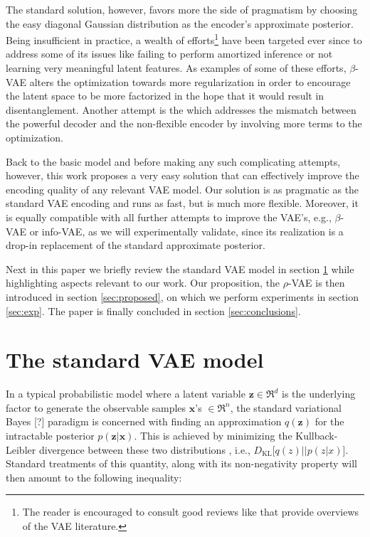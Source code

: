 \documentclass{article}
\begin{document}
The standard solution, however, favors more the side of pragmatism by choosing the easy diagonal Gaussian distribution as the encoder's approximate posterior. Being insufficient in practice, a wealth of efforts\footnote{The reader is encouraged to consult good reviews like \cite{tschannen2018recent} that provide overviews of the VAE literature.} have been targeted ever since to address some of its issues like failing to perform amortized inference or not learning very meaningful latent features. As examples of some of these efforts, $\beta$-VAE \cite{higgins2017beta} alters the optimization towards more regularization in order to encourage the latent space to be more factorized in the hope that it would result in disentanglement. Another attempt is the \cite{InfoVAE} which addresses the mismatch between the powerful decoder and the non-flexible encoder by involving more terms to the optimization.

Back to the basic model and before making any such complicating attempts, however, this work proposes a very easy solution that can effectively improve the encoding quality of any relevant  VAE model. Our solution is as pragmatic as the standard VAE encoding and runs as fast, but is much more flexible. Moreover, it is equally compatible with all further attempts to improve the VAE's, e.g., $\beta$-VAE or info-VAE, as we will experimentally validate, since its realization is a drop-in replacement of the standard approximate posterior. 

Next in this paper we briefly review the standard VAE model in section \ref{sec:VAE} while highlighting aspects relevant to our work. Our proposition, the $\rho$-VAE is then introduced in section \ref{sec:proposed}, on which we perform experiments in section \ref{sec:exp}. The paper is finally concluded in section \ref{sec:conclusions}.

\section{The standard VAE model} \label{sec:VAE}
In a typical probabilistic model where a latent variable $\mathbf{z} \in \Re^d$ is the underlying factor to generate the observable samples $\mathbf{x}$'s $\in \Re^n$, the standard variational Bayes [?] paradigm is concerned with finding an approximation $q(\mathbf{z})$ for the intractable posterior $p(\mathbf{z}|\mathbf{x})$. This is achieved by minimizing the Kullback-Leibler divergence between these two distributions , i.e., $D_{\text{KL}}\Big[ q(z) || p(z|x) \Big]$. Standard treatments of this quantity, along with its non-negativity property will then amount to the following inequality:
\end{document}
